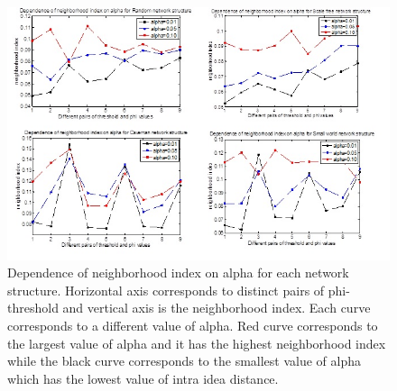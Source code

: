 \documentclass{beamer}
\begin{document}
\begin{frame}
\begin{figure}
[htp]
\begin{center}
\includegraphics{Fig4}
\end{center}
\caption{Dependence of neighborhood index on alpha for each network structure. Horizontal axis corresponds to distinct pairs of phi-threshold and   vertical axis is the neighborhood index. Each curve corresponds to a different value of alpha. Red curve corresponds to the largest value of alpha and it has the highest neighborhood index while the black curve corresponds to the smallest value of alpha which has the lowest value of intra idea distance.}
\label {fig4}
\end{figure}
\end{frame}
%
\end{document}
